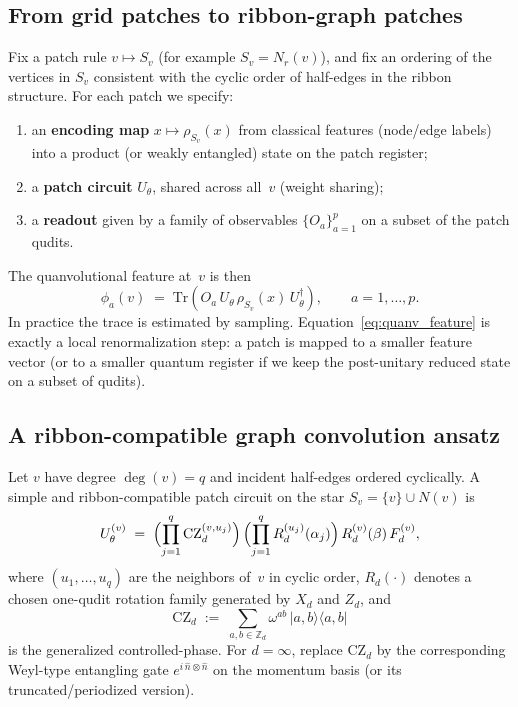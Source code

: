 \documentclass[11pt,oneside]{amsbook}
\numberwithin{equation}{section}
\theoremstyle{plain}
\theoremstyle{definition}
\theoremstyle{remark}
\newcommand{\ket}[1]{\lvert #1 \rangle}
\newcommand{\bra}[1]{\langle #1 \rvert}
\begin{document}
\subsection{From grid patches to ribbon-graph patches}
Fix a patch rule $v\mapsto S_v$ (for example $S_v=N_r(v)$), and fix an ordering of the vertices
in $S_v$ consistent with the cyclic order of half-edges in the ribbon structure.
For each patch we specify:
\begin{enumerate}
\item an \textbf{encoding map} $x\mapsto \rho_{S_v}(x)$ from classical features (node/edge labels)
into a product (or weakly entangled) state on the patch register;
\item a \textbf{patch circuit} $U_{\theta}$, shared across all~$v$ (weight sharing);
\item a \textbf{readout} given by a family of observables $\{O_a\}_{a=1}^p$ on a subset of the
patch qudits.
\end{enumerate}
The quanvolutional feature at~$v$ is then
\begin{equation}
  \phi_a(v)
  \;=\;
  \mathrm{Tr}\!\left(
    O_a\,
    U_{\theta}\,\rho_{S_v}(x)\,U_{\theta}^\dagger
  \right),
  \qquad a=1,\dots,p.
  \label{eq:quanv_feature}
\end{equation}
In practice the trace is estimated by sampling. Equation~\eqref{eq:quanv_feature} is exactly a
local renormalization step: a patch is mapped to a smaller feature vector (or to a smaller quantum
register if we keep the post-unitary reduced state on a subset of qudits).

\subsection{A ribbon-compatible graph convolution ansatz}
Let $v$ have degree $\deg(v)=q$ and incident half-edges ordered cyclically.
A simple and ribbon-compatible patch circuit on the star $S_v=\{v\}\cup N(v)$ is
\begin{equation}
  U_{\theta}^{(v)}
  \;=\;
  \Bigl(\prod_{j=1}^{q} \mathrm{CZ}_d^{(v,u_j)}\Bigr)\,
  \Bigl(\prod_{j=1}^{q} R_d^{(u_j)}(\alpha_j)\Bigr)\,
  R_d^{(v)}(\beta)\,F_d^{(v)},
  \label{eq:star_patch_unitary}
\end{equation}
where $(u_1,\dots,u_q)$ are the neighbors of~$v$ in cyclic order, $R_d(\cdot)$ denotes a chosen
one-qudit rotation family generated by $X_d$ and $Z_d$, and
\[
  \mathrm{CZ}_d \;:=\; \sum_{a,b\in\mathbb{Z}_d}\omega^{ab}\,\ket{a,b}\!\bra{a,b}
\]
is the generalized controlled-phase.
For $d=\infty$, replace $\mathrm{CZ}_d$ by the corresponding Weyl-type entangling gate
$e^{i\,\hat n\otimes \hat n}$ on the momentum basis (or its truncated/periodized version).
\end{document}
